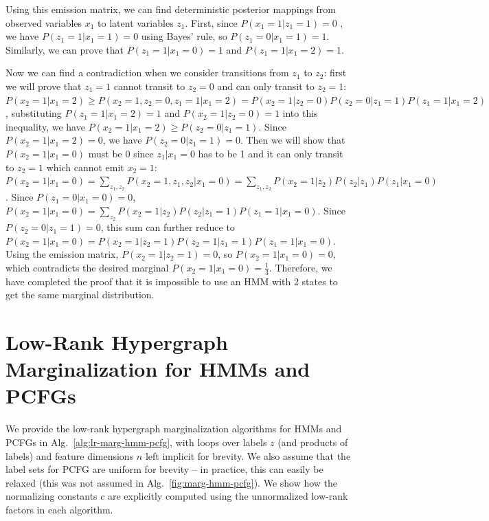 \documentclass{article}
\begin{document}
Using this emission matrix, we can find deterministic posterior mappings from observed variables $x_1$ to latent variables $z_1$. First, since $P(x_1=1|z_1=1)=0$ , we have $P(z_1=1|x_1=1)=0$ using Bayes’ rule, so $P(z_1=0|x_1=1)=1$. Similarly, we can prove that $P(z_1=1|x_1=0)=1$ and $P(z_1=1|x_1=2)=1$.

Now we can find a contradiction when we consider transitions from $z_1$ to $z_2$: first we will prove that $z_1=1$ cannot transit to $z_2=0$ and can only transit to $z_2=1$:  $P(x_2=1|x_1=2)\ge P(x_2=1, z_2=0, z_1=1|x_1=2) = P(x_2=1|z_2=0)P(z_2=0|z_1=1)P(z_1=1|x_1=2)$, substituting  $P(z_1=1|x_1=2)=1$ and $P(x_2=1|z_2=0)=1$ into this inequality, we have $P(x_2=1|x_1=2)\ge P(z_2=0|z_1=1)$. Since $P(x_2=1|x_1=2)=0$, we have $P(z_2=0|z_1=1)=0$. Then we will show that $P(x_2=1|x_1=0)$ must be 0 since $z_1|x_1=0$ has to be 1 and it can only transit to $z_2=1$ which cannot emit $x_2=1$:  $P(x_2=1|x_1=0) = \sum_{z_1, z_2}P(x_2=1, z_1, z_2|x_1=0) =  \sum_{z_1, z_2}P(x_2=1 | z_2)P(z_2|z_1) P(z_1|x_1=0)$. Since $P(z_1=0|x_1=0)=0$, $P(x_2=1|x_1=0) =\sum_{z_2} P(x_2=1|z_2)P(z_2|z_1=1)P(z_1=1|x_1=0)$. Since $P(z_2=0|z_1=1)=0$, this sum can further reduce to $P(x_2=1|x_1=0) =P(x_2=1|z_2=1)P(z_2=1|z_1=1)P(z_1=1|x_1=0)$. Using the emission matrix, $P(x_2=1|z_2=1)=0$, so $P(x_2=1|x_1=0) =0$, which contradicts the desired marginal $P(x_2=1|x_1=0) =\frac{1}{3}$. Therefore, we have completed the proof that it is impossible to use an HMM with 2 states to get the same marginal distribution.


\section{\label{sec:low-rank-marg}Low-Rank Hypergraph Marginalization for HMMs and PCFGs}
We provide the low-rank hypergraph marginalization algorithms for HMMs and PCFGs in
Alg.~\ref{alg:lr-marg-hmm-pcfg},
with loops over labels $z$ (and products of labels) and feature dimensions $n$ left implicit for brevity.
We also assume that the label sets for PCFG are uniform for brevity -- in practice,
this can easily be relaxed (this was not assumed in Alg.~\ref{fig:marg-hmm-pcfg}).
We show how the normalizing constants $c$ are explicitly computed using the unnormalized
low-rank factors in each algorithm.
\end{document}
